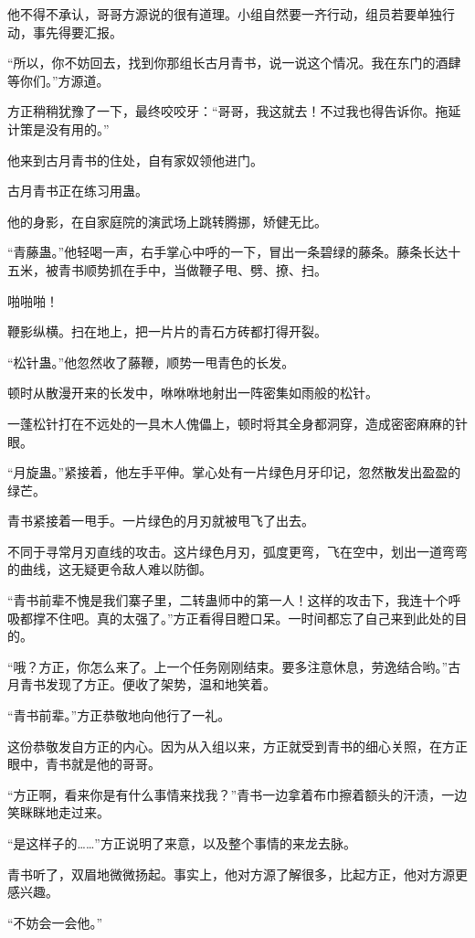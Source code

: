 \begin{this_body}
他不得不承认，哥哥方源说的很有道理。小组自然要一齐行动，组员若要单独行动，事先得要汇报。

“所以，你不妨回去，找到你那组长古月青书，说一说这个情况。我在东门的酒肆等你们。”方源道。

方正稍稍犹豫了一下，最终咬咬牙：“哥哥，我这就去！不过我也得告诉你。拖延计策是没有用的。”

他来到古月青书的住处，自有家奴领他进门。

古月青书正在练习用蛊。

他的身影，在自家庭院的演武场上跳转腾挪，矫健无比。

“青藤蛊。”他轻喝一声，右手掌心中呼的一下，冒出一条碧绿的藤条。藤条长达十五米，被青书顺势抓在手中，当做鞭子甩、劈、撩、扫。

啪啪啪！

鞭影纵横。扫在地上，把一片片的青石方砖都打得开裂。

“松针蛊。”他忽然收了藤鞭，顺势一甩青色的长发。

顿时从散漫开来的长发中，咻咻咻地射出一阵密集如雨般的松针。

一蓬松针打在不远处的一具木人傀儡上，顿时将其全身都洞穿，造成密密麻麻的针眼。

“月旋蛊。”紧接着，他左手平伸。掌心处有一片绿色月牙印记，忽然散发出盈盈的绿芒。

青书紧接着一甩手。一片绿色的月刃就被甩飞了出去。

不同于寻常月刃直线的攻击。这片绿色月刃，弧度更弯，飞在空中，划出一道弯弯的曲线，这无疑更令敌人难以防御。

“青书前辈不愧是我们寨子里，二转蛊师中的第一人！这样的攻击下，我连十个呼吸都撑不住吧。真的太强了。”方正看得目瞪口呆。一时间都忘了自己来到此处的目的。

“哦？方正，你怎么来了。上一个任务刚刚结束。要多注意休息，劳逸结合哟。”古月青书发现了方正。便收了架势，温和地笑着。

“青书前辈。”方正恭敬地向他行了一礼。

这份恭敬发自方正的内心。因为从入组以来，方正就受到青书的细心关照，在方正眼中，青书就是他的哥哥。

“方正啊，看来你是有什么事情来找我？”青书一边拿着布巾擦着额头的汗渍，一边笑眯眯地走过来。

“是这样子的……”方正说明了来意，以及整个事情的来龙去脉。

青书听了，双眉地微微扬起。事实上，他对方源了解很多，比起方正，他对方源更感兴趣。

“不妨会一会他。”


\end{this_body}
